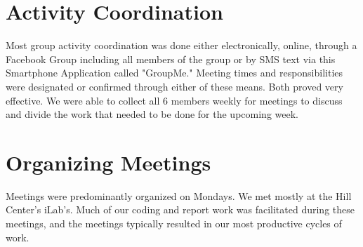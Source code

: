 \section{Activity Coordination}

Most group activity coordination was done either electronically, online, through a Facebook Group including all members of the group or by SMS text via this Smartphone Application called "GroupMe." Meeting times and responsibilities were designated or confirmed through either of these means. Both proved very effective. We were able to collect all 6 members weekly for meetings to discuss and divide the work that needed to be done for the upcoming week.

\section{Organizing Meetings}

Meetings were predominantly organized on Mondays. We met mostly at the Hill Center's iLab's. Much of our coding and report work was facilitated during these meetings, and the meetings typically resulted in our most productive cycles of work.  
